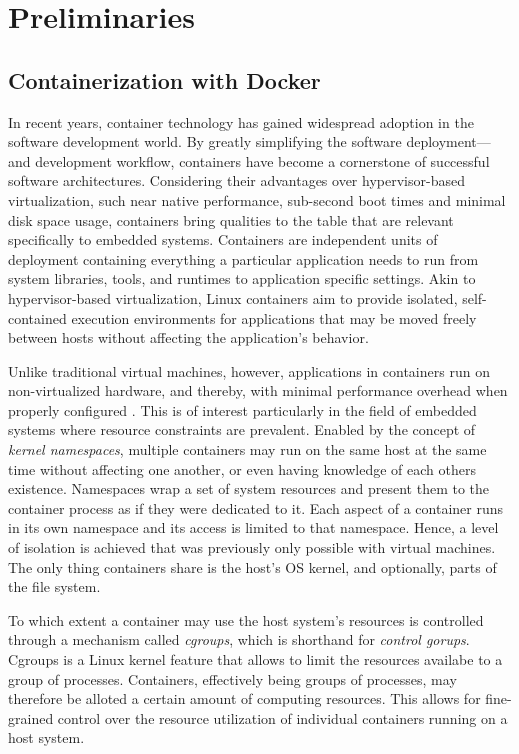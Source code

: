 

\chapter{Preliminaries}\label{chapter:preliminaries}


\section{Containerization with Docker}

In recent years, container technology has gained widespread adoption in the software development world. By greatly simplifying the software deployment—and development workflow, containers have become a cornerstone of successful software architectures.
Considering their advantages over hypervisor-based virtualization, such near native performance, sub-second boot times \cite{felter2015updated}\cite{morabito2015hypervisors} and minimal disk space usage, containers bring qualities to the table that are relevant specifically to embedded systems.
Containers are independent units of deployment containing everything a particular application needs to run from system libraries, tools, and runtimes to application specific settings. 
Akin to hypervisor-based virtualization, Linux containers aim to provide isolated, self-contained execution environments for applications that may be moved freely between hosts without affecting the application’s behavior.

Unlike traditional virtual machines, however, applications in containers run on non-virtualized hardware, and thereby, with minimal performance overhead when properly configured \cite{felter2015updated}\cite{morabito2015hypervisors}. This is of interest particularly in the field of embedded systems where resource constraints are prevalent.
Enabled by the concept of \emph{kernel namespaces}, multiple containers may run on the same host at the same time without affecting one another, or even having knowledge of each others existence. 
Namespaces wrap a set of system resources and present them to the container process as if they were dedicated to it. Each aspect of a container runs in its own namespace and its access is limited to that namespace. Hence, a level of isolation is achieved that was previously only possible with virtual machines. The only thing containers share is the host’s OS kernel, and optionally, parts of the file system.

To which extent a container may use the host system's resources is controlled through a mechanism called \emph{cgroups}, which is shorthand for \emph{control gorups}. 
Cgroups is a Linux kernel feature that allows to limit the resources availabe to a group of processes. Containers, effectively being groups of processes, may therefore be alloted a certain amount of computing resources. This allows for fine-grained control over the resource utilization of individual containers running on a host system.

